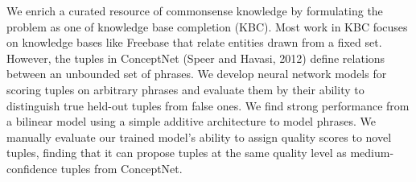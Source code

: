 We enrich a curated resource of commonsense knowledge by formulating the problem as one of knowledge base completion (KBC). Most work in KBC focuses on knowledge bases like Freebase that relate entities drawn from a fixed set. However, the tuples in ConceptNet (Speer and Havasi, 2012) define relations between an unbounded set of phrases. We develop neural network models for scoring tuples on arbitrary phrases and evaluate them by their ability to distinguish true held-out tuples from false ones. We find strong performance from a bilinear model using a simple additive architecture to model phrases. We manually evaluate our trained model's ability to assign quality scores to novel tuples, finding that it can propose tuples at the same quality level as medium-confidence tuples from ConceptNet.
